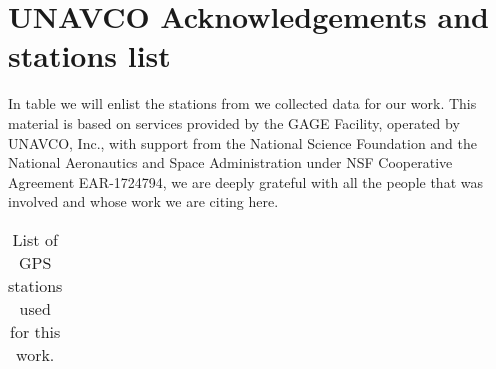 \section{UNAVCO Acknowledgements and stations list}

In table  we will enlist the stations from we collected data for our work. This material is based on services provided by the GAGE Facility, operated by UNAVCO, Inc., with support from the National Science Foundation and the National Aeronautics and Space Administration under NSF Cooperative Agreement EAR-1724794, we are deeply grateful with all the people that was involved and whose work we are citing here.



\clearpage
\onecolumn
\footnotesize
\begin{landscape}
\begin{table*}
    \centering
       \caption{List of GPS stations used for this work.}
      \label{tab:table-stations}
    \begin{tabular}{lllp{8cm}}
 

\end{tabular}
\end{table*}
\end{landscape}
